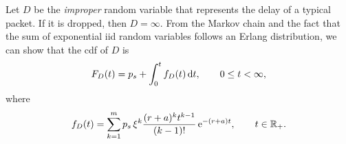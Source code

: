 Let $D$ be the \textit{improper} random variable that represents the delay of a typical packet. If it is dropped, then ${D=\infty}$.
%
From the Markov chain and the fact that the sum of exponential iid random variables follows an Erlang distribution, we can show that the cdf of $D$ is
\begin{align*}
    F_D(t) = p_s + \int_0^t f_D(t)\,\mathrm{d} t, \qquad 0\le t < \infty,
\end{align*}
where
\begin{align}
    f_D(t) = \sum_{k=1}^m p_s\,\xi^k \frac{ (r+a)^k t^{k-1}}{(k-1)!} \,\mathrm{e}^{-(r+a) t}, \qquad t\in{\mathbb R}_+.
\end{align}


